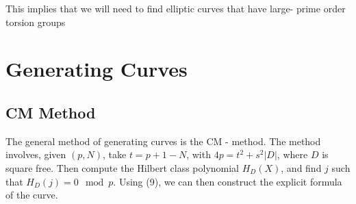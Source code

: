 \documentclass[12pt,twoside]{article}
\begin{document}
This implies that we will need to find elliptic curves that have large- prime order torsion groups




\section{Generating Curves} 

\subsection{CM Method} 
The general method of generating curves is the CM - method. 
The method involves, given $(p, N)$,  take $t = p+1 - N$, with $4p = t^{2} + s^{2}|D|$, where $D$ is square free. Then compute the Hilbert class polynomial $H_{D}(X)$, and find $j$ such that $H_{D}(j) = 0 \mod p$. Using (9), we can then construct the explicit formula of the curve.   










 

\end{document}
